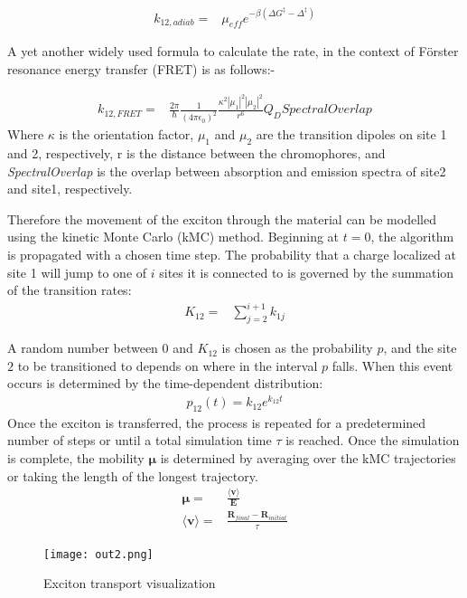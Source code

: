 \documentclass{article}
\begin{document}
\begin{align}
    k_{12,adiab}=&\mu_{eff}e^{-\beta(\Delta G^{\ddag}-\Delta^\ddag)}
\end{align}

A yet another widely used formula to calculate the rate, in the context of Förster resonance energy transfer (FRET) is as follows:-

\begin{align}
    k_{12,FRET}=&\frac{2\pi}{\hbar}\frac{1}{(4\pi\epsilon_0)^2} \frac{\kappa^2|\mu_1|^2|\mu_2|^2}{r^6}Q_DSpectralOverlap
\end{align}
Where $\kappa$ is the orientation factor, $\mu_1$ and $\mu_2$ are the transition dipoles on site 1 and 2, respectively, r is the distance between the chromophores, and \textit{SpectralOverlap} is the overlap between absorption and emission spectra of site2 and site1, respectively. 

Therefore the movement of the exciton through the material can be modelled using the kinetic Monte Carlo (kMC) method.\cite{Oberhofer2017ChargeMethods} Beginning at $t=0$, the algorithm is propagated with a chosen time step. The probability that a charge localized at site 1 will jump to one of $i$ sites it is connected to is governed by the summation of the transition rates:
\begin{align}
    K_{12}=&\sum_{j=2}^{i+1} k_{1j}
\end{align}

A random number between $0$ and $K_{12}$ is chosen as the probability $p$, and the site $2$ to be transitioned to depends on where in the interval $p$ falls. When this event occurs is determined by the time-dependent distribution:
\begin{align}
    p_{12}(t)=k_{12}e^{k_{12}t}
\end{align}
Once the exciton is transferred, the process is repeated for a predetermined number of steps or until a total simulation time $\tau$ is reached. 
Once the simulation is complete, the mobility $\mathbf{\mu}$ is determined by averaging over the kMC trajectories or taking the length of the longest trajectory.
\begin{align}
    \mathbf{\mu}=&\frac{\langle \mathbf{v}\rangle}{\mathbf{E}}\\
    \langle\mathbf{v}\rangle=&\frac{\mathbf{R}_{final}-\mathbf{R}_{initial}}{\tau}
\end{align}

\begin{figure}[H]
    \centering
  \texttt{[image: out2.png]}
    \caption{Exciton transport visualization}
    \label{fig:my_label}
\end{figure}
\end{document}
